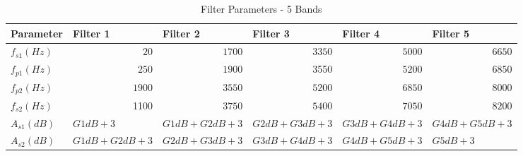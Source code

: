 \documentclass[11pt,onecolumn]{witseiepaper}
\begin{document}
\begin{appendices}
\begin{table}[htbp]
  \centering
  \caption{Filter Parameters - 5 Bands}
  \begin{adjustbox}{width=0.9\linewidth}
    \begin{tabular}{|l|l|l|l|l|l|}
    \hline
    \textbf{Parameter} & \textbf{Filter 1} & \textbf{Filter 2} & \textbf{Filter 3} & \textbf{Filter 4} & \textbf{Filter 5} \\
    \hline
    $f_{s1} (Hz)$   & \multicolumn{1}{r|}{$20$} & \multicolumn{1}{r|}{$1700$} & \multicolumn{1}{r|}{$3350$} & \multicolumn{1}{r|}{$5000$} & \multicolumn{1}{r|}{$6650$} \\
    \hline
    $f_{p1} (Hz)$   & \multicolumn{1}{r|}{$250$} & \multicolumn{1}{r|}{$1900$} & \multicolumn{1}{r|}{3550} & \multicolumn{1}{r|}{$5200$} & \multicolumn{1}{r|}{$6850$} \\
    \hline
    $f_{p2} (Hz)$   & \multicolumn{1}{r|}{$1900$} & \multicolumn{1}{r|}{$3550$} & \multicolumn{1}{r|}{$5200$} & \multicolumn{1}{r|}{$6850$} & \multicolumn{1}{r|}{$8000$} \\
    \hline
    $f_{s2} (Hz)$   & \multicolumn{1}{r|}{1100} & \multicolumn{1}{r|}{$3750$} & \multicolumn{1}{r|}{$5400$} & \multicolumn{1}{r|}{$7050$} & \multicolumn{1}{r|}{$8200$} \\
    \hline
    $A_{s1} (dB)$   &$ G1dB + 3 $& $G1dB + G2dB + 3 $& $G2dB + G3dB + 3$ &$ G3dB + G4dB + 3 $& $G4dB + G5dB + 3$ \\
    \hline
    $A_{s2} (dB)$   & $G1dB + G2dB + 3 $&$ G2dB + G3dB + 3 $&$ G3dB + G4dB + 3$ &$ G4dB + G5dB + 3$ &$ G5dB + 3$ \\
    \hline
    \end{tabular}%
    \end{adjustbox}
  \label{tab:filtPara5Band}%
\end{table}%


\end{appendices}
\end{document}
